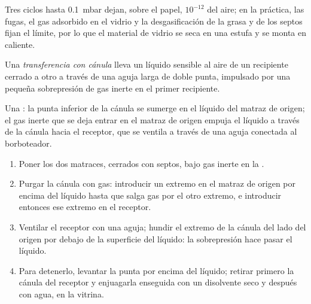 Tres ciclos hasta \qty{0.1}{mbar} dejan, sobre el papel, $10^{-12}$ del aire; en la práctica, las fugas, el gas
adsorbido en el vidrio y la desgasificación de la grasa y de los septos fijan el límite, por lo que
el material de vidrio se seca en una estufa y se monta en caliente.

\begin{definition}\label{def:b3:lab-techniques-3:cannula}
Una \emph{transferencia con cánula} lleva un líquido sensible al aire
de un recipiente cerrado a otro a través de una aguja larga de doble punta, impulsado
por una pequeña sobrepresión de gas inerte en el primer recipiente.
\end{definition}

\begin{omfigure}

{\small Una : la punta inferior de la cánula se sumerge en el líquido del
matraz de origen; el gas inerte que se deja entrar en el matraz de origen empuja el líquido a través de la
cánula hacia el receptor, que se ventila a través de una aguja conectada al borboteador.}
\end{omfigure}

\begin{method}\label{met:b3:lab-techniques-3:cannula}
\begin{enumerate}
  \item Poner los dos matraces, cerrados con septos, bajo gas inerte en la .
  \item Purgar la cánula con gas: introducir un extremo en el matraz de origen por encima del líquido
        hasta que salga gas por el otro extremo, e introducir entonces ese extremo en el receptor.
  \item Ventilar el receptor con una aguja; hundir el extremo de la cánula del lado del origen por debajo de la
        superficie del líquido: la sobrepresión hace pasar el líquido.
  \item Para detenerlo, levantar la punta por encima del líquido; retirar primero la cánula del receptor
        y enjuagarla enseguida con un disolvente seco y después con agua, en la vitrina.
\end{enumerate}
\end{method}

